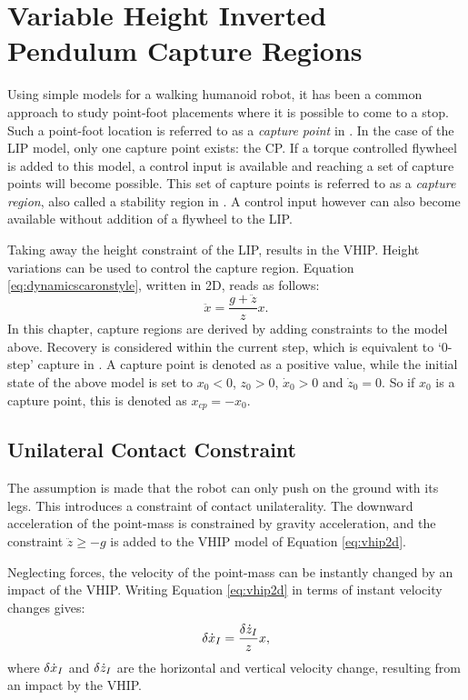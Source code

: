 %
\chapter{Variable Height Inverted Pendulum Capture Regions}\label{chap:regions}
Using simple models for a walking humanoid robot, it has been a common approach to study point-foot placements where it is possible to come to a stop. Such a point-foot location is referred to as a \textit{capture point} in \cite{pratt2006capture}. In the case of the \ac{LIP} model, only one capture point exists: the \ac{CP}. If a torque controlled flywheel is added to this model, a control input is available and reaching a set of capture points will become possible. This set of capture points is referred to as a \textit{capture region}, also called a stability region in \cite{stephens2007humanoid}. A control input however can also become available without addition of a flywheel to the \ac{LIP}.


Taking away the height constraint of the \ac{LIP}, results in the \ac{VHIP}. Height variations can be used to control the capture region. Equation \ref{eq:dynamicscaronstyle}, written in \ac{2D}, reads as follows:
\begin{equation}
	\label{eq:vhip2d}
	\ddot{x}=\frac{g+\ddot{z}}{z}x.
\end{equation}	
In this chapter, capture regions are derived by adding constraints to the model above. Recovery is considered within the current step, which is equivalent to `0-step' capture in \cite{koolen2012capturability}. A capture point is denoted as a positive value, while the initial state of the above model is set to $x_0<0$, $z_0>0$, $\dot{x}_0>0$ and $\dot{z}_0=0$. So if $x_0$ is a capture point, this is denoted as $x_{cp}=-x_0$.



\section{Unilateral Contact Constraint}
The assumption is made that the robot can only push on the ground with its legs. This introduces a constraint of contact unilaterality. The downward acceleration of the point-mass is constrained by gravity acceleration, and the constraint $\ddot{z} \geq -g$ is added to the \ac{VHIP} model of Equation \ref{eq:vhip2d}.

Neglecting forces, the velocity of the point-mass can be instantly changed by an impact of the \ac{VHIP}. Writing Equation \ref{eq:vhip2d} in terms of instant velocity changes gives:
\begin{equation}
	\label{eq:vhipi}
	\delta \dot{x}_I=\frac{\delta \dot{z}_I}{z}x,
\end{equation}	
where $\delta \dot{x}_I$ and $\delta \dot{z}_I$ are the horizontal and vertical velocity change, resulting from an impact by the \ac{VHIP}.

